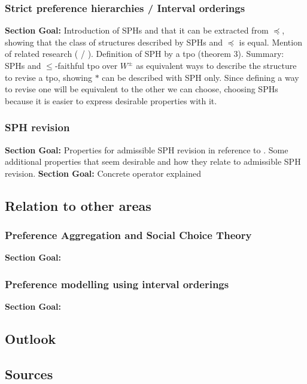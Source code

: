 \documentclass[11pt]{article}
\begin{document}
\subsubsection{Strict preference hierarchies / Interval orderings}
\textbf{Section Goal:} Introduction of SPHs and that it can be extracted from $\preceq$, showing that the class of structures described by SPHs and $\preceq$ is equal. Mention of related research (\cite{allen1983maintaining} / \cite{Oeztuerk2005}). Definition of SPH by a tpo (theorem 3). Summary: SPHs and $\leq$-faithful tpo over $W^{\pm}$ as equivalent ways to describe the structure to revise a tpo, showing $\ast$ can be described with SPH only. Since defining a way to revise one will be equivalent to the other we can choose, choosing SPHs because it is easier to express desirable properties with it.

\subsubsection{SPH revision}
\textbf{Section Goal:}  Properties for admissible SPH revision in reference to \cite{Booth2006a}. Some additional properties that seem desirable and how they relate to admissible SPH revision.
\textbf{Section Goal:} Concrete operator explained

\subsection{Relation to other areas}
\subsubsection{Preference Aggregation and Social Choice Theory}
\textbf{Section Goal:}
\subsubsection{Preference modelling using interval orderings}
\textbf{Section Goal:} 

\subsection{Outlook}
\subsection{Sources}
\end{document}
